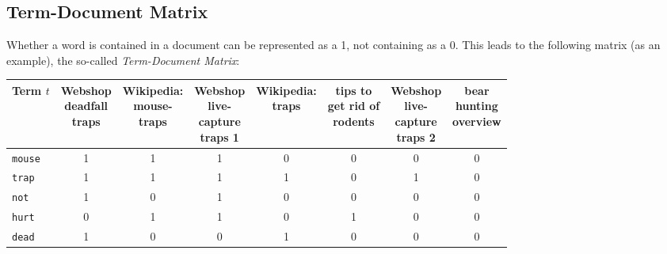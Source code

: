         \subsection{Term-Document Matrix} %
        	Whether a word is contained in a document can be represented as a 1, not containing as a 0. This leads to the following matrix (as an example), the so-called \textit{Term-Document Matrix}:
        	\begin{table}[H]
        		\centering
        		\begin{tabular}{|l|c|c|c|c|c|c|c|}
        			\hline
        			\textbf{Term} \(t\) & \makecell{Webshop \\ deadfall \\ traps} & \makecell{Wikipedia: \\ mouse- \\ traps} & \makecell{Webshop \\ live- \\ capture \\ traps 1} & \makecell{Wikipedia: \\ traps} & \makecell{tips to \\ get rid of \\ rodents} & \makecell{Webshop \\ live- \\ capture \\ traps 2} & \makecell{bear \\ hunting \\ overview} \\ \hline
        			\texttt{mouse}  &         1          &         1          &         1          & \textcolor{irl}{0} & \textcolor{irl}{0} & \textcolor{irl}{0} & \textcolor{irl}{0} \\ \hline
        			\texttt{trap}   &         1          &         1          &         1          &         1          & \textcolor{irl}{0} &         1          & \textcolor{irl}{0} \\ \hline
        			\texttt{not}    &         1          & \textcolor{irl}{0} &         1          & \textcolor{irl}{0} & \textcolor{irl}{0} & \textcolor{irl}{0} & \textcolor{irl}{0} \\ \hline
        			\texttt{hurt}   & \textcolor{irl}{0} &         1          &         1          & \textcolor{irl}{0} &         1          & \textcolor{irl}{0} & \textcolor{irl}{0} \\ \hline
        			\texttt{dead}   &         1          & \textcolor{irl}{0} & \textcolor{irl}{0} &         1          & \textcolor{irl}{0} & \textcolor{irl}{0} & \textcolor{irl}{0} \\ \hline

\end{tabular}
\end{table}
